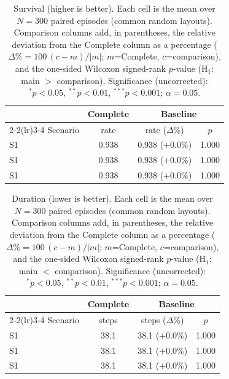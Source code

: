 \begin{table}[ht]
  \centering
  \caption{Survival (higher is better). Each cell is the mean over $N=300$ paired episodes (common random layouts). Comparison columns add, in parentheses, the relative deviation from the Complete column as a percentage ($\Delta\%=100\,(c-m)/|m|$; $m$=Complete, $c$=comparison), and the one-sided Wilcoxon signed-rank $p$-value (H$_1$: main $>$ comparison). Significance (uncorrected): $^{*}p<0.05$, $^{**}p<0.01$, $^{***}p<0.001$; $\alpha=0.05$.}
  \label{tab:wilcoxon-survival}
  \small
  \begin{tabular}{l c cc}
    \toprule
     & Complete & \multicolumn{2}{c}{Baseline} \\
    \cmidrule(lr){2-2}\cmidrule(lr){3-4}
    Scenario & {rate} & {rate ($\Delta$\%)} & {$p$} \\
    \midrule
    S1 & 0.938 & 0.938 (+0.0\%) & 1.000 \\
    S1 & 0.938 & 0.938 (+0.0\%) & 1.000 \\
    S1 & 0.938 & 0.938 (+0.0\%) & 1.000 \\
    \bottomrule
  \end{tabular}
\end{table}

\begin{table}[ht]
  \centering
  \caption{Duration (lower is better). Each cell is the mean over $N=300$ paired episodes (common random layouts). Comparison columns add, in parentheses, the relative deviation from the Complete column as a percentage ($\Delta\%=100\,(c-m)/|m|$; $m$=Complete, $c$=comparison), and the one-sided Wilcoxon signed-rank $p$-value (H$_1$: main $<$ comparison). Significance (uncorrected): $^{*}p<0.05$, $^{**}p<0.01$, $^{***}p<0.001$; $\alpha=0.05$.}
  \label{tab:wilcoxon-duration}
  \small
  \begin{tabular}{l c cc}
    \toprule
     & Complete & \multicolumn{2}{c}{Baseline} \\
    \cmidrule(lr){2-2}\cmidrule(lr){3-4}
    Scenario & {steps} & {steps ($\Delta$\%)} & {$p$} \\
    \midrule
    S1 & 38.1 & 38.1 (+0.0\%) & 1.000 \\
    S1 & 38.1 & 38.1 (+0.0\%) & 1.000 \\
    S1 & 38.1 & 38.1 (+0.0\%) & 1.000 \\
    \bottomrule
  \end{tabular}
\end{table}

